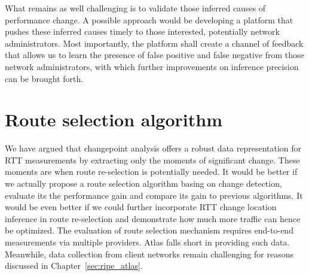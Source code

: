 What remains as well challenging is to validate those inferred causes of performance change. A possible approach would be developing a platform that pushes these inferred causes timely to those interested, potentially network administrators. Most importantly, the platform shall create a channel of feedback that allows us to learn the presence of false positive and false negative from those network administrators, with which further improvements on inference precision can be brought forth.

\section{Route selection algorithm}
We have argued that changepoint analysis offers a robust data representation for RTT measurements by extracting only the moments of significant change. These moments are when route re-selection is potentially needed. It would be better if we actually propose a route selection algorithm basing on change detection, evaluate its the performance gain and compare its gain to previous algorithms.
It would be even better if we could further incorporate RTT change location inference in route re-selection and demonstrate how much more traffic can hence be optimized.
The evaluation of route selection mechanism requires end-to-end measurements via multiple providers.
Atlas falls short in providing such data.
Meanwhile, data collection from client networks remain challenging for reasons discussed in Chapter~\ref{sec:ripe_atlas}.
 